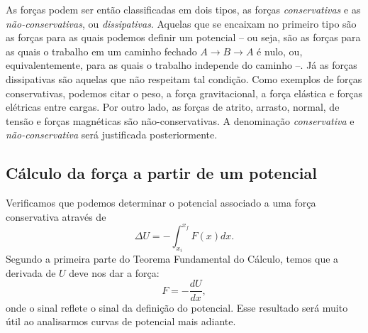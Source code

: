 As forças podem ser então classificadas em dois tipos, as forças \emph{conservativas} e as \emph{não-conservativas}, ou \emph{dissipativas}. Aquelas que se encaixam no primeiro tipo são as forças para as quais podemos definir um potencial -- ou seja, são as forças para as quais o trabalho em um caminho fechado $A\to B\to A$ é nulo, ou, equivalentemente, para as quais o trabalho independe do caminho --. Já as forças dissipativas são aquelas que não respeitam tal condição. Como exemplos de forças conservativas, podemos citar o peso, a força gravitacional, a força elástica e forças elétricas entre cargas. Por outro lado, as forças de atrito, arrasto, normal, de tensão e forças magnéticas são não-conservativas. A denominação \emph{conservativa} e \emph{não-conservativa} será justificada posteriormente.




\subsection{Cálculo da força a partir de um potencial}

Verificamos que podemos determinar o potencial associado a uma força conservativa através de
\begin{equation}
  \Delta U = - \int_{x_i}^{x_f} F(x) dx.
\end{equation}
%
Segundo a primeira parte do Teorema Fundamental do Cálculo, temos que a derivada de $U$ deve nos dar a força: 
\begin{equation}\label{Eq:ForcaGradPot}
  F =  -\frac{dU}{dx},
\end{equation}
%
onde o sinal reflete o sinal da definição do potencial. Esse resultado será muito útil ao analisarmos curvas de potencial mais adiante.

